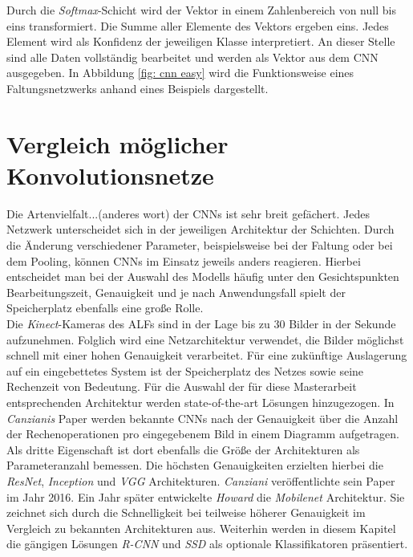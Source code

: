 		Durch die \textit{Softmax}-Schicht wird der Vektor in einem Zahlenbereich von null bis eins transformiert. Die Summe aller Elemente des Vektors ergeben eins. Jedes Element wird als Konfidenz der jeweiligen Klasse interpretiert. An dieser Stelle sind alle Daten vollständig bearbeitet und werden als Vektor aus dem CNN ausgegeben. In Abbildung \ref{fig: cnn easy} wird die Funktionsweise eines Faltungsnetzwerks anhand eines Beispiels dargestellt.\\
		
		\section{Vergleich möglicher Konvolutionsnetze}
		\label{sec: cnns}
		Die Artenvielfalt...(anderes wort) der CNNs ist sehr breit gefächert. Jedes Netzwerk unterscheidet sich in der jeweiligen Architektur der Schichten. Durch die Änderung verschiedener Parameter, beispielsweise bei der Faltung oder bei dem Pooling, können CNNs im Einsatz jeweils anders reagieren. Hierbei entscheidet man bei der Auswahl des Modells häufig unter den Gesichtspunkten Bearbeitungszeit, Genauigkeit und je nach Anwendungsfall spielt der Speicherplatz ebenfalls eine große Rolle.\\
		
		Die \textit{Kinect}-Kameras des ALFs sind in der Lage bis zu 30 Bilder in der Sekunde aufzunehmen. Folglich wird eine Netzarchitektur verwendet, die Bilder möglichst schnell mit einer hohen Genauigkeit verarbeitet. Für eine zukünftige Auslagerung auf ein eingebettetes System ist der Speicherplatz des Netzes sowie seine Rechenzeit von Bedeutung. Für die Auswahl der für diese Masterarbeit entsprechenden Architektur werden state-of-the-art Lösungen hinzugezogen. In \textit{Canzianis} Paper \cite{cnnvergleich} werden bekannte CNNs nach der Genauigkeit über die Anzahl der Rechenoperationen pro eingegebenem Bild in einem Diagramm aufgetragen. Als dritte Eigenschaft ist dort ebenfalls die Größe der Architekturen als Parameteranzahl bemessen. Die höchsten Genauigkeiten erzielten hierbei die \textit{ResNet}, \textit{Inception} und \textit{VGG} Architekturen. \textit{Canziani} veröffentlichte sein Paper im Jahr 2016. Ein Jahr später entwickelte \textit{Howard} \cite{mobilenets} die \textit{Mobilenet} Architektur. Sie zeichnet sich durch die Schnelligkeit bei teilweise höherer Genauigkeit im Vergleich zu bekannten Architekturen aus. Weiterhin werden in diesem Kapitel die gängigen Lösungen \textit{R-CNN} und \textit{SSD} als optionale Klassifikatoren präsentiert.\\
		
